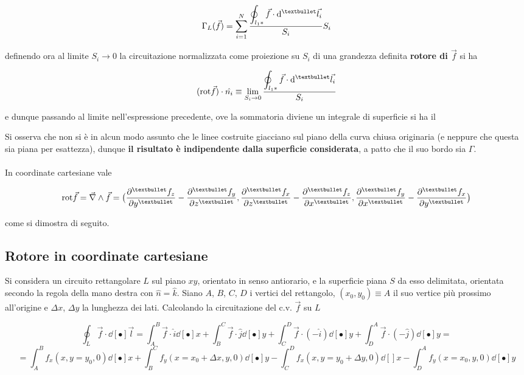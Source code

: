 \[\Gamma_L(\vec{f}) = \sum\limits_{i=1}^{N} \frac{\ds \oint_{l_1*} \vec{f} \cdot \dd[•]{\vec{l_i}}}{S_i} S_i\]

definendo ora al limite $S_i \rightarrow 0$ la circuitazione normalizzata come proiezione su $S_i$ di una grandezza definita \textbf{rotore di $\vec{f}$} si ha

\[(\mathrm{rot} \vec{f}) \cdot \hat{n_i} \equiv \lim\limits_{S_i \rightarrow 0} \frac{\ds \oint_{l_1*} \vec{f} \cdot \dd[•]{\vec{l_i}}}{S_i}\]

e dunque passando al limite nell'espressione precedente, ove la sommatoria diviene un integrale di superficie si ha il


Si osserva che non si è in alcun modo assunto che le linee costruite giacciano sul piano della curva chiusa originaria (e neppure che questa sia piana per esattezza), dunque \textbf{il risultato è indipendente dalla superficie considerata}, a patto che il suo bordo sia $\Gamma$.
\\~\\In coordinate cartesiane vale

\[\mathrm{rot} \vec{f} = \vec{\nabla} \wedge \vec{f} = \big(\pdv[•]{f_z}{y} - \pdv[•]{f_y}{z}, \pdv[•]{f_x}{z} - \pdv[•]{f_z}{x}, \pdv[•]{f_y}{x} - \pdv[•]{f_x}{y}\big)\]

come si dimostra di seguito.

\subsection{Rotore in coordinate cartesiane}

Si considera un circuito rettangolare $L$ sul piano $xy$, orientato in senso antiorario, e la superficie piana $S$ da esso delimitata, orientata secondo la regola della mano destra con $\hat{n} = \hat{k}$. Siano $A$, $B$, $C$, $D$ i vertici del rettangolo, $(x_0, y_0) \equiv A$ il suo vertice più prossimo all'origine e $\Delta x$, $\Delta y$ la lunghezza dei lati. Calcolando la circuitazione del c.v. $\vec{f}$ su $L$

\[\oint_L \vec{f} \cdot \dd[•]{\vec{l}} = \int_A^B \vec{f} \cdot \hat{i} \dd[•]{x} + \int_B^C \vec{f} \cdot \hat{j} \dd[•]{y} + \int_C^D \vec{f} \cdot (-\hat{i}) \dd[•]{y} + \int_D^A \vec{f} \cdot (-\hat{j}) \dd[•]{y} = \]
\[ = \int_A^B f_x(x, y=y_0, 0) \dd[•]{x} + \int_B^C f_y(x = x_0 + \Delta x, y, 0) \dd[•]{y} - \int_C^D f_x(x, y = y_0 + \Delta y, 0) \dd[]{x} - \int_D^A f_y(x = x_0, y, 0) \dd[•]{y}\]

